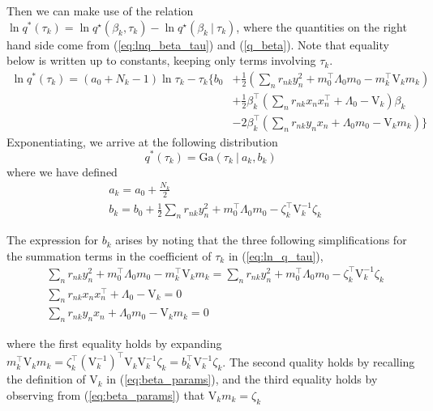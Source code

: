 \documentclass[twoside,11pt]{article}
\newcommand\given[1][]{\:#1\vert\:}
\newcommand{\transpose}[1]{#1^{\intercal}}
\begin{document}
Then we can make use of the relation $\ln q^{*}(\tau_k) = \ln q^{\star}(\beta_k, \tau_k) -  \ln q^{\star}(\beta_k \given \tau_k)$, where the quantities on the right hand side come from (\ref{eq:lnq_beta_tau}) and (\ref{q_beta}). Note that equality below is written up to constants, keeping only terms involving $\tau_k$. 
\begin{equation}\label{eq:ln_q_tau}
\begin{split}
	 \ln q^{*}(\tau_k) = (a_0 + N_k - 1) \ln \tau_k - \tau_k \Bigg\{ b_0 & + \frac{1}{2} \left( \sum_{n}r_{nk}y_n^2 + \transpose{m_0} \Lambda_0 m_0 - \transpose{m_k} \mathrm{V}_k m_k \right) \\
	 & + \frac{1}{2} \transpose{\beta_k} \left( \sum_{n} r_{nk} x_n \transpose{x_n} + \Lambda_0 - \mathrm{V}_k \right) \beta_k \\
	 & - 2 \transpose{\beta_k} \left( \sum_{n} r_{nk} y_n x_n + \Lambda_0 m_0 - \mathrm{V}_k m_k \right) \Bigg\}
\end{split}
\end{equation}
Exponentiating, we arrive at the following distribution
\begin{equation} \label{eq:q_tau}
	q^{*}(\tau_k) =  \mathrm{Ga}\left( \tau_k \given a_k, b_k \right)
\end{equation}
where we have defined
\begin{equation} \label{eq:tau_params}
\begin{split}
	& a_k = a_0 + \frac{N_k}{2} \\
	& b_k = b_0 + \frac{1}{2} \sum_{n} r_{nk} y_n^2 + \transpose{m_0} \Lambda_0 m_0 - \transpose{\zeta_k} \mathrm{V}_k^{-1} \zeta_k
\end{split}
\end{equation}

The expression for $b_k$ arises by noting that the three following simplifications for the summation terms in the coefficient of $\tau_k$ in (\ref{eq:ln_q_tau}), 
\begin{align*}
	& \sum_{n}r_{nk}y_n^2 + \transpose{m_0} \Lambda_0 m_0 - \transpose{m_k} \mathrm{V}_k m_k =  \sum_{n}r_{nk}y_n^2 + \transpose{m_0} \Lambda_0 m_0 -\transpose{\zeta_k} \mathrm{V}_k^{-1} \zeta_k \\
	& \sum_{n} r_{nk} x_n \transpose{x_n} + \Lambda_0 - \mathrm{V}_k = 0 \\
	& \sum_{n} r_{nk} y_n x_n + \Lambda_0 m_0 - \mathrm{V}_k m_k = 0
\end{align*}

where the first equality holds by expanding $\transpose{m_k} \mathrm{V}_k m_k = \transpose{\zeta_k} \left( \mathrm{V}_k^{-1}\right)^{\intercal} \mathrm{V}_k \mathrm{V}_k^{-1} \zeta_k = \transpose{b_k} \mathrm{V}_k^{-1} \zeta_k$. The second quality holds by recalling the definition of $\mathrm{V}_k$ in (\ref{eq:beta_params}), and the third equality holds by observing from (\ref{eq:beta_params}) that $\mathrm{V}_{k} m_k = \zeta_k$
\end{document}
